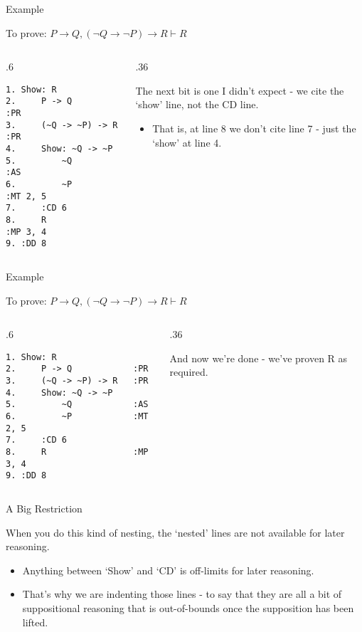 \documentclass[
  ignorenonframetext,
]{beamer}
\providecommand{\tightlist}{%
  \setlength{\itemsep}{0pt}\setlength{\parskip}{0pt}}
\renewcommand{\,}{\text{, }}
\def\begincols{\begin{columns}}
\def\begincol{\begin{column}}
\def\endcol{\end{column}}
\def\endcols{\end{columns}}
\begin{document}
\begin{frame}[fragile]{Example}
\protect\hypertarget{example-14}{}

To prove:
\(P \rightarrow Q, (\neg Q \rightarrow \neg P) \rightarrow R \vdash R\)

\bigskip

\begincols
\begincol{.6\textwidth}

\begin{verbatim}
1. Show: R
2.     P -> Q            :PR
3.     (~Q -> ~P) -> R   :PR
4.     Show: ~Q -> ~P
5.         ~Q            :AS
6.         ~P            :MT 2, 5
7.     :CD 6
8.     R                 :MP 3, 4
9. :DD 8
\end{verbatim}

\endcol
\begincol{.36\textwidth}

The next bit is one I didn't expect - we cite the `show' line, not the
CD line.

\begin{itemize}
\tightlist
\item
  That is, at line 8 we don't cite line 7 - just the `show' at line 4.
\end{itemize}

\endcol
\endcols

\end{frame}

\begin{frame}[fragile]{Example}
\protect\hypertarget{example-15}{}

To prove:
\(P \rightarrow Q, (\neg Q \rightarrow \neg P) \rightarrow R \vdash R\)

\bigskip

\begincols
\begincol{.6\textwidth}

\begin{verbatim}
1. Show: R
2.     P -> Q            :PR
3.     (~Q -> ~P) -> R   :PR
4.     Show: ~Q -> ~P
5.         ~Q            :AS
6.         ~P            :MT 2, 5
7.     :CD 6
8.     R                 :MP 3, 4
9. :DD 8
\end{verbatim}

\endcol
\begincol{.36\textwidth}

And now we're done - we've proven R as required.

\endcol
\endcols

\end{frame}

\begin{frame}{A Big Restriction}
\protect\hypertarget{a-big-restriction}{}

When you do this kind of nesting, the `nested' lines are not available
for later reasoning.

\begin{itemize}
\tightlist
\item
  Anything between `Show' and `CD' is off-limits for later reasoning.
\item
  That's why we are indenting those lines - to say that they are all a
  bit of suppositional reasoning that is out-of-bounds once the
  supposition has been lifted.
\end{itemize}

\end{frame}
\end{document}
